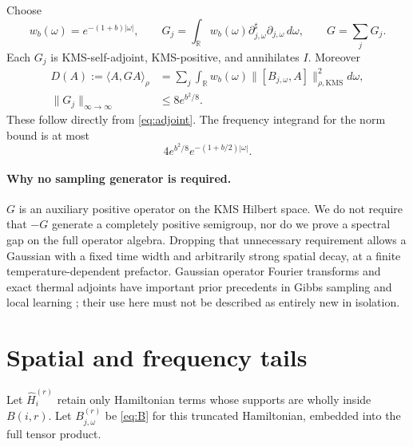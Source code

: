 \documentclass[11pt]{article}
\theoremstyle{remark}\newtheorem{remark}[theorem]{Remark}
\newcommand{\ip}[2]{\langle #1,#2\rangle_\rho}
\newcommand{\kn}[1]{\|#1\|_{\rho,\mathrm{KMS}}}
\newcommand{\R}{\mathbb R}\newcommand{\C}{\mathbb C}
\begin{document}
Choose
\begin{equation}\label{eq:G}
 w_b(\omega)=e^{-(1+b)|\omega|},\qquad
 G_j=\int_\R w_b(\omega)\partial_{j,\omega}^{\sharp}\partial_{j,\omega}\,d\omega,
 \qquad G=\sum_jG_j.
\end{equation}
Each $G_j$ is KMS-self-adjoint, KMS-positive, and annihilates $I$. Moreover
\begin{align}\label{eq:D}
 D(A):=\ip A{GA}
 &=\sum_j\int_\R w_b(\omega)\kn{[B_{j,\omega},A]}^2d\omega,\\
 \|G_j\|_{\infty\to\infty}&\le8e^{b^2/8}.\label{eq:Gnorm}
\end{align}
These follow directly from \eqref{eq:adjoint}. The frequency integrand for the norm bound is at most
\[4e^{b^2/8}e^{-(1+b/2)|\omega|}.\]

\paragraph{Why no sampling generator is required.}
$G$ is an auxiliary positive operator on the KMS Hilbert space. We do not require that $-G$ generate a completely positive semigroup, nor do we prove a spectral gap on the full operator algebra. Dropping that unnecessary requirement allows a Gaussian with a fixed time width and arbitrarily strong spatial decay, at a finite temperature-dependent prefactor. Gaussian operator Fourier transforms and exact thermal adjoints have important prior precedents in Gibbs sampling and local learning \cite{CKG,CAN,Berg}; their use here must not be described as entirely new in isolation.

\section{Spatial and frequency tails}\label{sec:tails}
Let $\widehat H_i^{(r)}$ retain only Hamiltonian terms whose supports are wholly inside $B(i,r)$. Let $B_{j,\omega}^{(r)}$ be \eqref{eq:B} for this truncated Hamiltonian, embedded into the full tensor product.
\end{document}
